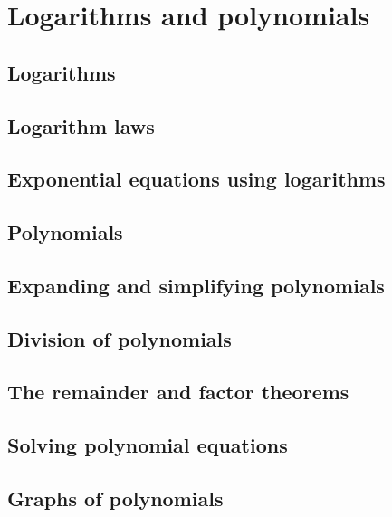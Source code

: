\section{Logarithms and polynomials}
\begin{outline}

\0
\subsection{Logarithms}

\0
\subsection{Logarithm laws}

\0
\subsection{Exponential equations using logarithms}

\0
\subsection{Polynomials}

\0
\subsection{Expanding and simplifying polynomials}

\0
\subsection{Division of polynomials}

\0
\subsection{The remainder and factor theorems}

\0
\subsection{Solving polynomial equations}

\0
\subsection{Graphs of polynomials}

\end{outline}
